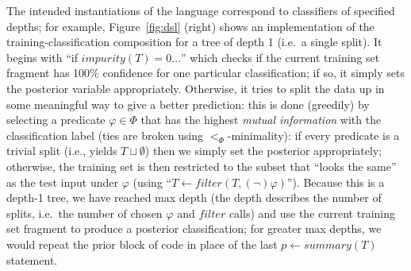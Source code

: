 The intended instantiations of the language correspond
to classifiers of specified depths;
for example, Figure~\ref{fig:dsl} (right) shows an implementation of
the training-classification composition for a tree of depth 1
(i.e.\ a single split).
It begins with ``if $\mathit{impurity}(T) = 0 \ldots$''
which checks if the current training set fragment has 100\% confidence
for one particular classification;
if so, it simply sets the posterior variable appropriately.
Otherwise, it tries to split the data up in some meaningful way
to give a better prediction:
this is done (greedily) by selecting a predicate $\varphi \in \Phi$
that has the highest \emph{mutual information} with the classification label
(ties are broken using $<_\Phi$-minimality):
if every predicate is a trivial split (i.e., yields $T \sqcup \emptyset$)
then we simply set the posterior appropriately;
otherwise, the training set is then restricted to the subset
that ``looks the same'' as the test input under $\varphi$
(using ``$T \gets \mathit{filter}(T, (\lnot)\varphi)$'').
Because this is a depth-1 tree, we have reached max depth
(the depth describes the number of splits, i.e.\ the number of
chosen $\varphi$ and $\mathit{filter}$ calls)
and use the current training set fragment to produce a posterior classification;
for greater max depths, we would repeat the prior block of code
in place of the last $p \gets \mathit{summary}(T)$ statement.
